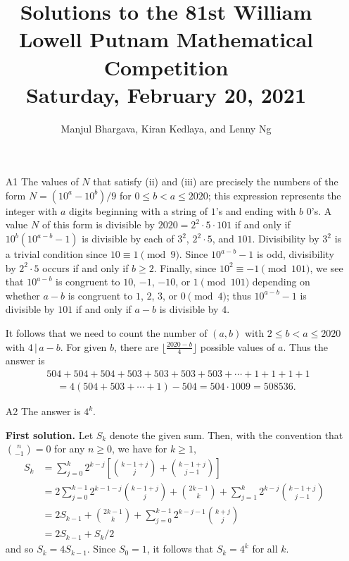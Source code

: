 \documentclass[amssymb,twocolumn,pra,10pt,aps]{revtex4-1}
\begin{document}
\title{Solutions to the 81st William Lowell Putnam Mathematical Competition \\
    Saturday, February 20, 2021}
\author{Manjul Bhargava, Kiran Kedlaya, and Lenny Ng}
\noaffiliation
\maketitle

\begin{itemize}
\item[A1]
The values of $N$ that satisfy (ii) and (iii) are precisely the numbers of the form $N = (10^a-10^b)/9$ for $0\leq b<a\leq 2020$; this expression represents the integer with $a$ digits beginning with a string of $1$'s and ending with $b$ $0$'s. A value $N$ of this form is divisible by $2020 = 2^2 \cdot 5 \cdot 101$ if and only if $10^b(10^{a-b}-1)$ is divisible by each of $3^2$, $2^2\cdot 5$, and $101$. Divisibility by $3^2$ is a trivial condition since $10 \equiv 1 \pmod{9}$. Since $10^{a-b}-1$ is odd, divisibility by $2^2\cdot 5$ occurs if and only if $b \geq 2$. Finally, since $10^2 \equiv -1 \pmod{101}$, we see that $10^{a-b}$ is congruent to $10$, $-1$, $-10$, or $1 \pmod{101}$ depending on whether $a-b$ is congruent to $1$, $2$, $3$, or $0 \pmod{4}$; thus $10^{a-b}-1$ is divisible by $101$ if and only if $a-b$ is divisible by $4$.

It follows that we need to count the number of $(a,b)$ with $2\leq b<a\leq 2020$ with $4\,|\,a-b$. For given $b$, there are $\lfloor \frac{2020-b}{4} \rfloor$ possible values of $a$. Thus the answer is
\begin{align*}
& 504+504+504+503+503+503+503+\cdots+1+1+1+1  \\
&\quad = 4(504+503+\cdots+1)-504 = 504\cdot 1009 = 508536.
\end{align*}

\item[A2]
The answer is $4^k$. 

\noindent
\textbf{First solution.}
Let $S_k$ denote the given sum. Then, with the convention that ${n\choose{-1}} = 0$ for any $n\geq 0$, we have for $k\geq 1$,
\begin{align*}
S_k &= \sum_{j=0}^k 2^{k-j} \left[ {{k-1+j}\choose {j}} + {{k-1+j}\choose {j-1}} \right] \\
&= 2\sum_{j=0}^{k-1} 2^{k-1-j} {{k-1+j}\choose j}+{{2k-1}\choose k} + \sum_{j=1}^k 2^{k-j}{{k-1+j}\choose{j-1}} \\
&= 2S_{k-1} + {{2k-1}\choose{k}} + \sum_{j=0}^{k-1} 2^{k-j-1}{{k+j}\choose j} \\
&= 2S_{k-1}+S_k/2
\end{align*}
and so $S_k = 4S_{k-1}$. Since $S_0 = 1$, it follows that $S_k = 4^k$ for all $k$.


\end{itemize}
\end{document}
